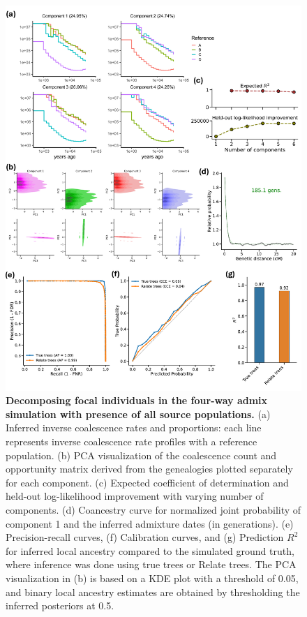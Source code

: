 \begin{figure}[h!]
    \centering
    \includegraphics[width=\linewidth]{figures/gb_sims/gb_sim_4way_nonghost.pdf}
    \captionsetup{width=\textwidth+3cm}     \caption{
    \footnotesize
    \textbf{Decomposing focal individuals in the four-way admix simulation with presence of all source populations.} (a) Inferred inverse coalescence rates and proportions: each line represents inverse coalescence rate profiles with a reference population. (b) PCA visualization of the coalescence count and opportunity matrix derived from the genealogies plotted separately for each component. (c) Expected coefficient of determination and held-out log-likelihood improvement with varying number of components. (d) Coancestry curve for normalized joint probability of component 1 and the inferred admixture dates (in generations). (e) Precision-recall curves, (f) Calibration curves, and (g) Prediction $R^2$ for inferred local ancestry compared to the simulated ground truth, where inference was done using true trees or Relate trees. The PCA visualization in (b) is based on a KDE plot with a threshold of 0.05, and binary local ancestry estimates are obtained by thresholding the inferred posteriors at 0.5.
    }
    \label{fig:gb_sim_four_nonghost}
\end{figure}

